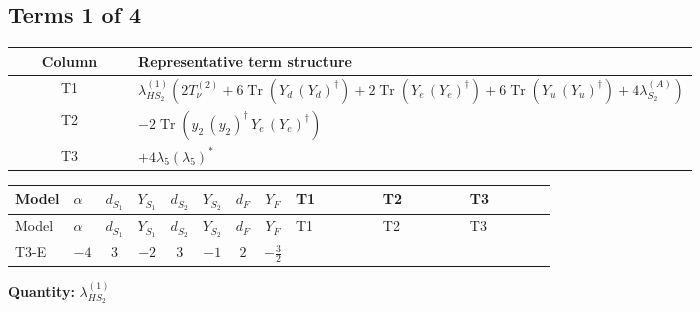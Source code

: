 \documentclass[8pt]{article}
\begin{document}
\begin{landscape}
\subsection*{Terms 1 of 4}
\begin{center}
\begin{tabular}{@{}c >{\raggedright\arraybackslash}p{0.82\linewidth}@{}}
\toprule
Column & Representative term structure \\
\midrule
T1 & \(\displaystyle {\lambda_{HS_2}^{(1)}} (2 T_{\nu}^{(2)}+6 \operatorname{Tr}\!\left({Y_d}\,\left({Y_d}\right)^{\dagger}\right)+2 \operatorname{Tr}\!\left({Y_e}\,\left({Y_e}\right)^{\dagger}\right)+6 \operatorname{Tr}\!\left({Y_u}\,\left({Y_u}\right)^{\dagger}\right)+4 {\lambda_{S_2}^{(A)}})\) \\
\midrule
T2 & \(\displaystyle -2 \operatorname{Tr}\!\left({y_2}\,\left({y_2}\right)^{\dagger}\,{Y_e}\,\left({Y_e}\right)^{\dagger}\right)\) \\
\midrule
T3 & \(\displaystyle +4 {\lambda_5} \left({\lambda_5}\right)^{*}\) \\
\midrule
\bottomrule
\end{tabular}
\end{center}
\smallskip
\tiny
\begin{longtable}{@{}llcccccc >{\raggedright\arraybackslash}p{0.21\linewidth} >{\raggedright\arraybackslash}p{0.21\linewidth} >{\raggedright\arraybackslash}p{0.21\linewidth}@{}}
\toprule
Model & $\alpha$ & $d_{S_1}$ & $Y_{S_1}$ & $d_{S_2}$ & $Y_{S_2}$ & $d_F$ & $Y_F$ & T1 & T2 & T3 \\
\midrule
\endfirsthead
\toprule
Model & $\alpha$ & $d_{S_1}$ & $Y_{S_1}$ & $d_{S_2}$ & $Y_{S_2}$ & $d_F$ & $Y_F$ & T1 & T2 & T3 \\
\midrule
\endhead
T3-E & $-4$ & $3$ & $-2$ & $3$ & $-1$ & $2$ & $-\frac{3}{2}$ & \scriptsize\adjustbox{max width=\linewidth}{$\begin{gathered} {\lambda_{HS_2}^{(1)}} (2 T_{\nu}^{(2)}+6 \operatorname{Tr}\!\left({Y_d}\,\left({Y_d}\right)^{\dagger}\right)+2 \operatorname{Tr}\!\left({Y_e}\,\left({Y_e}\right)^{\dagger}\right)+6 \operatorname{Tr}\!\left({Y_u}\,\left({Y_u}\right)^{\dagger}\right)+4 {\lambda_{S_2}^{(A)}})\end{gathered}$} & \scriptsize\adjustbox{max width=\linewidth}{$\begin{gathered} -2 \operatorname{Tr}\!\left({y_2}\,\left({y_2}\right)^{\dagger}\,{Y_e}\,\left({Y_e}\right)^{\dagger}\right)\end{gathered}$} & \scriptsize\adjustbox{max width=\linewidth}{$\begin{gathered} +4 {\lambda_5} \left({\lambda_5}\right)^{*}\end{gathered}$} \\
\midrule
\bottomrule
\end{longtable}
\clearpage
\noindent\textbf{Quantity: }$\lambda_{HS_2}^{(1)}$\par\smallskip

\end{landscape}
\end{document}
